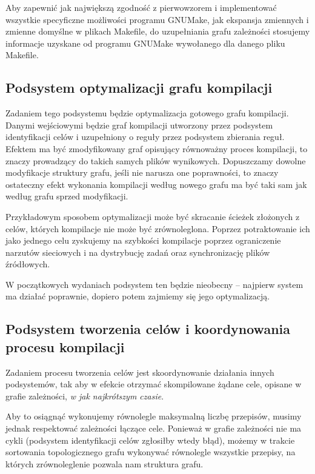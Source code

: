 \documentclass[a4paper]{article}
\begin{document}
Aby zapewnić jak największą zgodność z pierwowzorem i implementować wszystkie specyficzne możliwości programu GNUMake, jak ekspansja zmiennych i zmienne domyślne w plikach Makefile, do uzupełniania grafu zależności stosujemy informacje uzyskane od programu GNUMake wywołanego dla danego pliku Makefile.

\subsection{Podsystem optymalizacji grafu kompilacji}

Zadaniem tego podsystemu będzie optymalizacja gotowego grafu kompilacji.
Danymi wejściowymi będzie graf kompilacji utworzony przez podsystem identyfikacji celów i uzupełniony o reguły przez podsystem zbierania reguł.
Efektem ma być zmodyfikowany graf opisujący równoważny proces kompilacji, to znaczy prowadzący do takich samych plików wynikowych.
Dopuszczamy dowolne modyfikacje struktury grafu, jeśli nie narusza one poprawności, to znaczy ostateczny efekt wykonania kompilacji według nowego grafu ma być taki sam jak według grafu sprzed modyfikacji.

Przykładowym sposobem optymalizacji może być skracanie ścieżek złożonych z celów, których kompilacje nie może być zrównoleglona.
Poprzez potraktowanie ich jako jednego celu zyskujemy na szybkości kompilacje poprzez ograniczenie narzutów sieciowych i na dystrybucję zadań oraz synchronizację plików źródłowych.

W początkowych wydaniach podsystem ten będzie nieobecny -- najpierw system ma działać poprawnie, dopiero potem zajmiemy się jego optymalizacją.

\subsection{Podsystem tworzenia celów i koordynowania procesu kompilacji}

Zadaniem procesu tworzenia celów jest skoordynowanie działania innych podsystemów, tak aby w efekcie otrzymać skompilowane żądane cele, opisane w grafie zależności, \emph{w jak najkrótszym czasie}.

Aby to osiągnąć wykonujemy równolegle maksymalną liczbę przepisów, musimy jednak respektować zależności łączące cele.
Ponieważ w grafie zależności nie ma cykli (podsystem identyfikacji celów zgłosiłby wtedy błąd), możemy w trakcie sortowania topologicznego grafu wykonywać równolegle wszystkie przepisy, na których zrównoleglenie pozwala nam struktura grafu.
\end{document}
